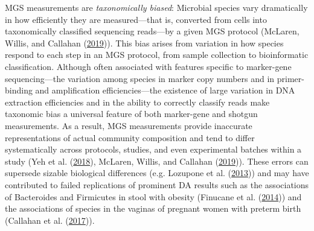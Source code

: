 \documentclass[
]{article}
\begin{document}
MGS measurements are \emph{taxonomically biased}: Microbial species vary dramatically in how efficiently they are measured---that is, converted from cells into taxonomically classified sequencing reads---by a given MGS protocol (McLaren, Willis, and Callahan (\protect\hyperlink{ref-mclaren2019cons}{2019})).
This bias arises from variation in how species respond to each step in an MGS protocol, from sample collection to bioinformatic classification.
Although often associated with features specific to marker-gene sequencing---the variation among species in marker copy numbers and in primer-binding and amplification efficiencies---the existence of large variation in DNA extraction efficiencies and in the ability to correctly classify reads make taxonomic bias a universal feature of both marker-gene and shotgun measurements.
As a result, MGS measurements provide inaccurate representations of actual community composition and tend to differ systematically across protocols, studies, and even experimental batches within a study (Yeh et al. (\protect\hyperlink{ref-yeh2018taxo}{2018}), McLaren, Willis, and Callahan (\protect\hyperlink{ref-mclaren2019cons}{2019})).
These errors can supersede sizable biological differences (e.g. Lozupone et al. (\protect\hyperlink{ref-lozupone2013meta}{2013})) and may have contributed to failed replications of prominent DA results such as the associations of Bacteroides and Firmicutes in stool with obesity (Finucane et al. (\protect\hyperlink{ref-finucane2014atax}{2014})) and the associations of species in the vaginas of pregnant women with preterm birth (Callahan et al. (\protect\hyperlink{ref-callahan2017repl}{2017})).
\end{document}
